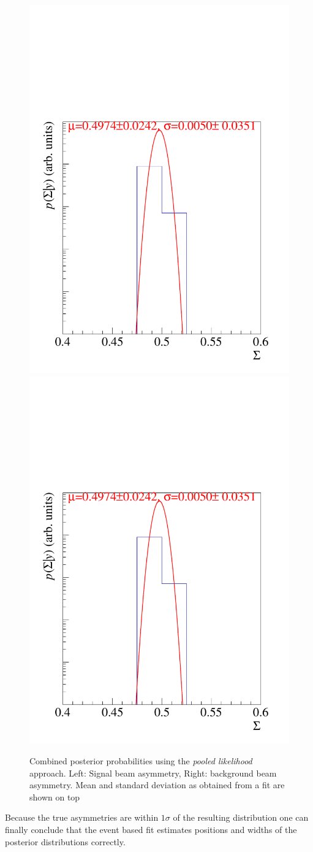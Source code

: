 \begin{figure}[htbp]
	\includegraphics[width=.49\linewidth]{../bayes/event_based_fit/plots/combined_post_mul.pdf}
	\includegraphics[width=.49\linewidth]{../bayes/event_based_fit/plots/combined_post_mul.pdf}
	\caption{Combined posterior probabilities using the \emph{pooled likelihood} approach. Left: Signal beam asymmetry, Right: background beam asymmetry. Mean and standard deviation as obtained from a  fit are shown on top}
	\label{fig:poollik}
\end{figure}
 Because the true asymmetries are within $1\sigma$ of the resulting distribution one can finally conclude that the event based fit estimates positions and widths of the posterior distributions correctly. 
 
